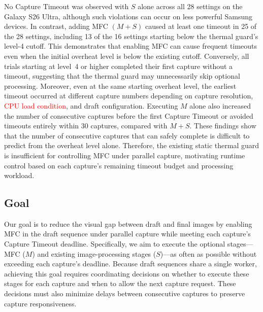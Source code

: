 No Capture Timeout was observed with \(S\) alone across all 28 settings on the Galaxy S26 Ultra, although such violations can occur on less powerful Samsung devices. In contrast, adding MFC \((M+S)\) caused at least one timeout in 25 of the 28 settings, including 13 of the 16 settings starting below the thermal guard's level-4 cutoff.
This demonstrates that enabling MFC can cause frequent timeouts even when the initial overheat level is below the existing cutoff.
Conversely, all trials starting at level~4 or higher completed their first capture without a timeout, suggesting that the thermal guard may unnecessarily skip optional processing.
Moreover, even at the same starting overheat level, the earliest timeout occurred at different capture numbers depending on capture resolution, \textcolor{red}{CPU load condition}, and draft configuration.
Executing \(M\) alone also increased the number of consecutive captures before the first Capture Timeout or avoided timeouts entirely within 30 captures, compared with \(M+S\).
These findings show that the number of consecutive captures that can safely complete is difficult to predict from the overheat level alone.
Therefore, the existing static thermal guard is insufficient for controlling MFC under parallel capture, motivating runtime control based on each capture's remaining timeout budget and processing workload.

\subsection{Goal}
\label{sec:research-goal}

Our goal is to reduce the visual gap between draft and final images by enabling MFC in the draft sequence under parallel capture while meeting each capture's Capture Timeout deadline.
Specifically, we aim to execute the optional stages---MFC (\(M\)) and existing image-processing stages (\(S\))---as often as possible without exceeding each capture's deadline.
Because draft sequences share a single worker, achieving this goal requires coordinating decisions on whether to execute these stages for each capture and when to allow the next capture request.
These decisions must also minimize delays between consecutive captures to preserve capture responsiveness.

